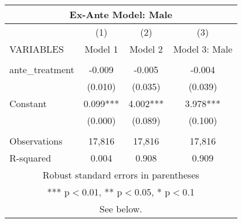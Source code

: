\begin{tabular}{lccc}
\multicolumn{4}{c}{Ex-Ante Model: Male} \\ \hline
 & (1) & (2) & (3) \\
VARIABLES & Model 1 & Model 2 & Model 3: Male \\ \hline
 &  &  &  \\
ante\_treatment & -0.009 & -0.005 & -0.004 \\
 & (0.010) & (0.035) & (0.039) \\
Constant & 0.099*** & 4.002*** & 3.978*** \\
 & (0.000) & (0.089) & (0.100) \\
 &  &  &  \\
Observations & 17,816 & 17,816 & 17,816 \\
 R-squared & 0.004 & 0.908 & 0.909 \\ \hline
\multicolumn{4}{c}{ Robust standard errors in parentheses} \\
\multicolumn{4}{c}{ *** p$<$0.01, ** p$<$0.05, * p$<$0.1} \\
\multicolumn{4}{c}{ See below.} \\
\end{tabular}
